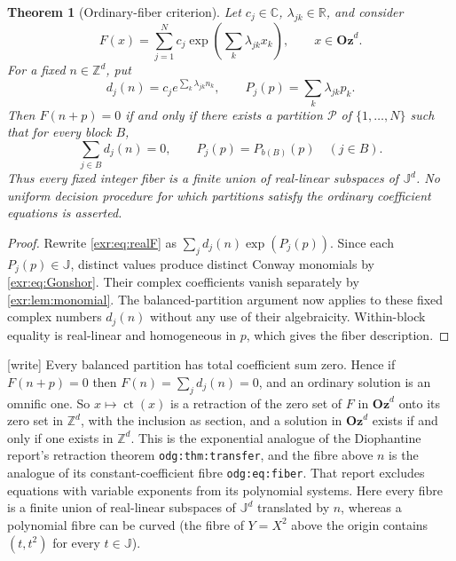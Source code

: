 \documentclass[11pt,letterpaper]{article}
\numberwithin{equation}{section}
\newtheorem{theorem}{Theorem}[section]
\theoremstyle{definition}
\theoremstyle{remark}
\newcommand{\Oz}{\mathbf{Oz}}
\newcommand{\Z}{\mathbb Z}
\newcommand{\R}{\mathbb R}
\newcommand{\C}{\mathbb C}
\newcommand{\J}{\mathbb J}
\newcommand{\ct}{\operatorname{ct}}
\newcommand{\lbl}[1]{\nolinkurl{#1}}%
\newcommand{\wtag}{\textup{[write]}}%
\begin{document}
\begin{theorem}[Ordinary-fiber criterion]\label{exr:thm:fibers}
Let $c_j\in\C$, $\lambda_{jk}\in\R$, and consider
\begin{equation}\label{exr:eq:realF}
 F(x)=\sum_{j=1}^{N}c_j\exp\!\left(\sum_k\lambda_{jk}x_k\right),
 \qquad x\in\Oz^d.
\end{equation}
For a fixed $n\in\Z^d$, put
\begin{equation}
 d_j(n)=c_j e^{\sum_k\lambda_{jk}n_k},\qquad
 P_j(p)=\sum_k\lambda_{jk}p_k.
\end{equation}
Then $F(n+p)=0$ if and only if there exists a partition $\mathcal P$ of
$\{1,\ldots,N\}$ such that for every block $B$,
\begin{equation}\label{exr:eq:fiberblock}
 \sum_{j\in B}d_j(n)=0,
 \qquad P_j(p)=P_{b(B)}(p)\quad(j\in B).
\end{equation}
Thus every fixed integer fiber is a finite union of real-linear subspaces of
$\J^d$. No uniform decision procedure for which partitions satisfy the ordinary
coefficient equations is asserted.
\end{theorem}
\begin{proof}
Rewrite \eqref{exr:eq:realF} as $\sum_jd_j(n)\exp(P_j(p))$. Since each $P_j(p)\in\J$,
distinct values produce distinct Conway monomials by \eqref{exr:eq:Gonshor}.
Their complex coefficients vanish separately by \cref{exr:lem:monomial}. The
balanced-partition argument now applies to these fixed complex numbers $d_j(n)$
without any use of their algebraicity. Within-block equality is real-linear and
homogeneous in $p$, which gives the fiber description.
\end{proof}

\wtag{} Every balanced partition has total coefficient sum zero. Hence if
$F(n+p)=0$ then $F(n)=\sum_jd_j(n)=0$, and an ordinary solution is an omnific
one. So $x\mapsto\ct(x)$ is a retraction of the zero set of $F$ in $\Oz^d$ onto
its zero set in $\Z^d$, with the inclusion as section, and a solution in
$\Oz^d$ exists if and only if one exists in $\Z^d$. This is the exponential
analogue of the Diophantine report's retraction theorem
\lbl{odg:thm:transfer}, and the fibre above $n$ is the analogue of its
constant-coefficient fibre \lbl{odg:eq:fiber}. That report excludes
equations with variable exponents from its polynomial systems. Here every
fibre is a finite union of real-linear subspaces of $\J^d$ translated by $n$,
whereas a polynomial fibre can be curved (the fibre of $Y=X^2$ above the
origin contains $(t,t^2)$ for every $t\in\J$).
\end{document}
